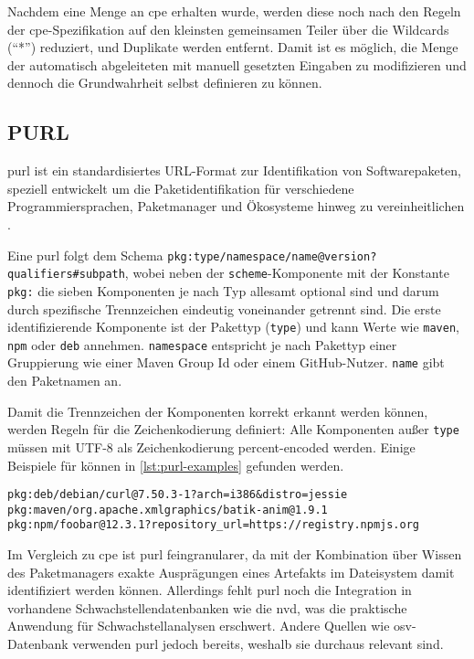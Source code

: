 Nachdem eine Menge an \acrshort{cpe} erhalten wurde, werden diese noch nach den Regeln der \acrshort{cpe}-Spezifikation auf den kleinsten gemeinsamen Teiler über die Wildcards (\enquote{*}) reduziert, und Duplikate werden entfernt.
Damit ist es möglich, die Menge der automatisch abgeleiteten  mit manuell gesetzten Eingaben zu modifizieren und dennoch die Grundwahrheit selbst definieren zu können.

\subsection{PURL}

\acrshort{purl} ist ein standardisiertes URL-Format zur Identifikation von Softwarepaketen, speziell entwickelt um die Paketidentifikation für verschiedene Programmiersprachen, Paketmanager und Ökosysteme hinweg zu vereinheitlichen \autocite{PackageURLSpec}.

Eine \acrshort{purl} folgt dem Schema \texttt{pkg:type/namespace/name@version?qualifiers\#subpath}, wobei neben der \texttt{scheme}-Komponente mit der Konstante \texttt{pkg:} die sieben Komponenten je nach Typ allesamt optional sind und darum durch spezifische Trennzeichen eindeutig voneinander getrennt sind.
Die erste identifizierende Komponente ist der Pakettyp (\texttt{type}) und kann Werte wie \texttt{maven}, \texttt{npm} oder \texttt{deb} annehmen.
\texttt{namespace} entspricht je nach Pakettyp einer Gruppierung wie einer Maven Group Id oder einem GitHub-Nutzer.
\texttt{name} gibt den Paketnamen an.

Damit die Trennzeichen der Komponenten korrekt erkannt werden können, werden Regeln für die Zeichenkodierung definiert: Alle Komponenten außer \texttt{type} müssen mit UTF-8 als Zeichenkodierung percent-encoded werden.
Einige Beispiele für  können in \autoref{lst:purl-examples} gefunden werden.

\begin{lstlisting}[caption=Beispielhafte PURLs verschiedener Pakettypen,label=lst:purl-examples]
pkg:deb/debian/curl@7.50.3-1?arch=i386&distro=jessie
pkg:maven/org.apache.xmlgraphics/batik-anim@1.9.1
pkg:npm/foobar@12.3.1?repository_url=https://registry.npmjs.org
\end{lstlisting}

Im Vergleich zu \acrshort{cpe} ist \acrshort{purl} feingranularer, da mit der Kombination über Wissen des Paketmanagers exakte Ausprägungen eines Artefakts im Dateisystem damit identifiziert werden können.
Allerdings fehlt \acrshort{purl} noch die Integration in vorhandene Schwachstellendatenbanken wie die \acrshort{nvd}, was die praktische Anwendung für Schwachstellanalysen erschwert.
Andere Quellen wie \acrshort{osv}-Datenbank verwenden \acrshort{purl} jedoch bereits, weshalb sie durchaus relevant sind.

